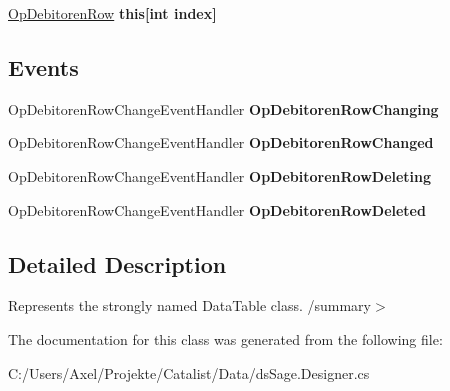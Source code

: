 \begin{DoxyCompactItemize}
\item 
\hyperlink{class_products_1_1_data_1_1ds_sage_1_1_op_debitoren_row}{Op\+Debitoren\+Row} {\bfseries this\mbox{[}int index\mbox{]}}\hypertarget{class_products_1_1_data_1_1ds_sage_1_1_op_debitoren_data_table_a08b6240c6b761b7385e6e6b722641809}{}\label{class_products_1_1_data_1_1ds_sage_1_1_op_debitoren_data_table_a08b6240c6b761b7385e6e6b722641809}

\end{DoxyCompactItemize}
\subsection*{Events}
\begin{DoxyCompactItemize}
\item 
Op\+Debitoren\+Row\+Change\+Event\+Handler {\bfseries Op\+Debitoren\+Row\+Changing}\hypertarget{class_products_1_1_data_1_1ds_sage_1_1_op_debitoren_data_table_a4e97aa787247cf49a0d07fd06f98f476}{}\label{class_products_1_1_data_1_1ds_sage_1_1_op_debitoren_data_table_a4e97aa787247cf49a0d07fd06f98f476}

\item 
Op\+Debitoren\+Row\+Change\+Event\+Handler {\bfseries Op\+Debitoren\+Row\+Changed}\hypertarget{class_products_1_1_data_1_1ds_sage_1_1_op_debitoren_data_table_a53031fc703c0904a720b7487a33b889e}{}\label{class_products_1_1_data_1_1ds_sage_1_1_op_debitoren_data_table_a53031fc703c0904a720b7487a33b889e}

\item 
Op\+Debitoren\+Row\+Change\+Event\+Handler {\bfseries Op\+Debitoren\+Row\+Deleting}\hypertarget{class_products_1_1_data_1_1ds_sage_1_1_op_debitoren_data_table_ad1f0e9d17ecb5fe15c4dde5f60fba90c}{}\label{class_products_1_1_data_1_1ds_sage_1_1_op_debitoren_data_table_ad1f0e9d17ecb5fe15c4dde5f60fba90c}

\item 
Op\+Debitoren\+Row\+Change\+Event\+Handler {\bfseries Op\+Debitoren\+Row\+Deleted}\hypertarget{class_products_1_1_data_1_1ds_sage_1_1_op_debitoren_data_table_a8f3371e97c619e13e519ed9bb7fd54dc}{}\label{class_products_1_1_data_1_1ds_sage_1_1_op_debitoren_data_table_a8f3371e97c619e13e519ed9bb7fd54dc}

\end{DoxyCompactItemize}


\subsection{Detailed Description}
Represents the strongly named Data\+Table class. /summary$>$ 

The documentation for this class was generated from the following file\+:\begin{DoxyCompactItemize}
\item 
C\+:/\+Users/\+Axel/\+Projekte/\+Catalist/\+Data/ds\+Sage.\+Designer.\+cs\end{DoxyCompactItemize}
